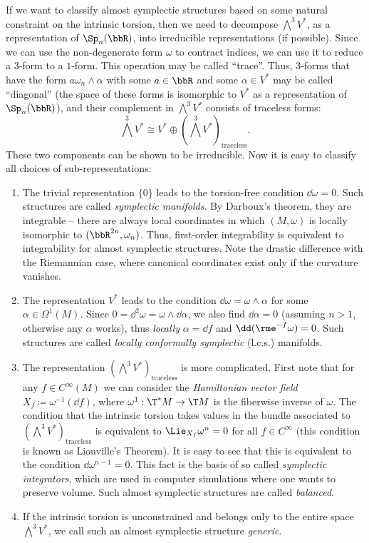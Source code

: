 \begin{example}
    If we want to classify almost symplectic structures based on some natural constraint on the intrinsic torsion, then we need to decompose $\bigwedge^3 V^\ast$, as a representation of $\Sp_{n}(\bbR)$, into irreducible representations (if possible). Since we can use the non-degenerate form $\omega$ to contract indices, we can use it to reduce a $3$-form to a $1$-form. This operation may be called ``trace''. Thus, $3$-forms that have the form $a\omega_n\wedge\alpha$ with some $a\in\bbR$ and some $\alpha\in V^\ast$ may be called ``diagonal'' (the space of these forms is isomorphic to $V^\ast$ as a representation of $\Sp_n(\bbR)$), and their complement in $\bigwedge^3 V^\ast$ consists of traceless forms:
    \[\bigwedge^3 V^\ast \cong V^\ast\oplus \left(\bigwedge^3 V^\ast\right)_{\mathrm{traceless}}.\]
    These two components can be shown to be irreducible. Now it is easy to classify all choices of sub-representations:
    \begin{enumerate}
        \item The trivial representation $\{0\}$ leads to the torsion-free condition $\dd\omega=0$. Such structures are called \emph{symplectic manifolds}. By Darboux's theorem, they are integrable -- there are always local coordinates in which $(M,\omega)$ is locally isomorphic to $(\bbR^{2n},\omega_n)$. Thus, first-order integrability is equivalent to integrability for almost symplectic structures. Note the drastic difference with the Riemannian case, where canonical coordinates exist only if the curvature vanishes.
        \item The representation $V^\ast$ leads to the condition $\dd\omega=\omega\wedge \alpha$ for some $\alpha\in\Omega^1(M)$. Since $0=\dd^2\omega=\omega\wedge\dd\alpha$, we also find $\dd\alpha=0$ (assuming $n>1$, otherwise any $\alpha$ works), thus \emph{locally} $\alpha=\dd f$ and $\dd (\rme^{-f}\omega)=0$. Such structures are called \emph{locally conformally symplectic} (l.c.s.) manifolds.
        \item The representation $\left(\bigwedge^3 V^\ast\right)_{\mathrm{traceless}}$ is more complicated. First note that for any $f\in C^\infty(M)$ we can consider the \emph{Hamiltonian vector field} $X_f\coloneqq \omega^{-1}(\dd f)$, where $\omega^1:\T^\ast M\to \T M$ is the fiberwise inverse of $\omega$. The condition that the intrinsic torsion takes values in the bundle associated to $\left(\bigwedge^3 V^\ast\right)_{\mathrm{traceless}}$ is equivalent to $\Lie_{X_f}\omega^n=0$ for all $f\in C^\infty$ (this condition is known as Liouville's Theorem). It is easy to see that this is equivalent to the condition $\dd\omega^{n-1}=0$. This fact is the basis of so called \emph{symplectic integrators}, which are used in computer simulations where one wants to preserve volume. Such almost symplectic structures are called \emph{balanced}.
        \item If the intrinsic torsion is unconstrained and belongs only to the entire space $\bigwedge^3 V^\ast$, we call such an almost symplectic structure \emph{generic}.
    \end{enumerate}
\end{example}


